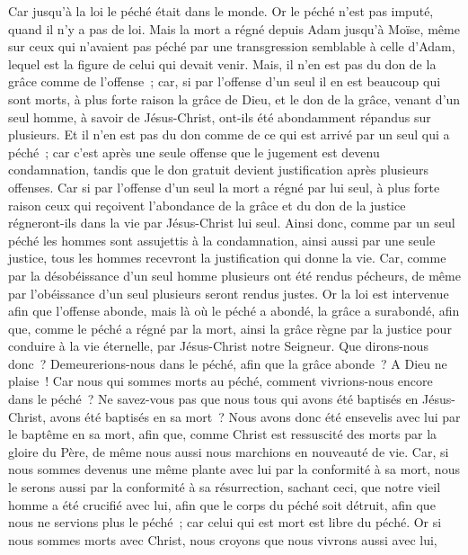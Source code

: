 \begin{multicols}{2}
Car jusqu'à la loi le péché était dans le monde. Or le péché n'est pas imputé, quand il n'y a pas de loi.
Mais la mort a régné depuis Adam jusqu'à Moïse, même sur ceux qui n'avaient pas péché par une transgression semblable à celle d'Adam, lequel est la figure de celui qui devait venir.
Mais, il n'en est pas du don de la grâce comme de l'offense~; car, si par l'offense d'un seul il en est beaucoup qui sont morts, à plus forte raison la grâce de Dieu, et le don de la grâce, venant d'un seul homme, à savoir de Jésus-Christ, ont-ils été abondamment répandus sur plusieurs.
Et il n'en est pas du don comme de ce qui est arrivé par un seul qui a péché~; car c'est après une seule offense que le jugement est devenu condamnation, tandis que le don gratuit devient justification après plusieurs offenses.
Car si par l'offense d'un seul la mort a régné par lui seul, à plus forte raison ceux qui reçoivent l'abondance de la grâce et du don de la justice régneront-ils dans la vie par Jésus-Christ lui seul.
Ainsi donc, comme par un seul péché les hommes sont assujettis à la condamnation, ainsi aussi par une seule justice, tous les hommes recevront la justification qui donne la vie.
Car, comme par la désobéissance d'un seul homme plusieurs ont été rendus pécheurs, de même par l'obéissance d'un seul plusieurs seront rendus justes.
Or la loi est intervenue afin que l'offense abonde, mais là où le péché a abondé, la grâce a surabondé,
afin que, comme le péché a régné par la mort, ainsi la grâce règne par la justice pour conduire à la vie éternelle, par Jésus-Christ notre Seigneur.
\VerseOne{}Que dirons-nous donc~? Demeurerions-nous dans le péché, afin que la grâce abonde~?
A Dieu ne plaise~! Car nous qui sommes morts au péché, comment vivrions-nous encore dans le péché~?
Ne savez-vous pas que nous tous qui avons été baptisés en Jésus-Christ, avons été baptisés en sa mort~?
Nous avons donc été ensevelis avec lui par le baptême en sa mort, afin que, comme Christ est ressuscité des morts par la gloire du Père, de même nous aussi nous marchions en nouveauté de vie.
Car, si nous sommes devenus une même plante avec lui par la conformité à sa mort, nous le serons aussi par la conformité à sa résurrection,
sachant ceci, que notre vieil homme a été crucifié avec lui, afin que le corps du péché soit détruit, afin que nous ne servions plus le péché~;
car celui qui est mort est libre du péché.
Or si nous sommes morts avec Christ, nous croyons que nous vivrons aussi avec lui,

\end{multicols}
